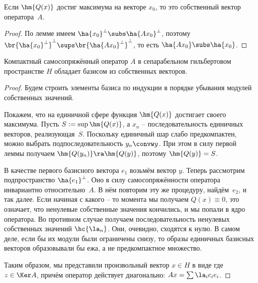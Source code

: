 \documentclass[a4paper]{article}
\begin{document}
\begin{imp}
Если $\hm{Q(x)}$ достиг максимума на векторе $x_0$, то это собственный вектор оператора~$A$.
\end{imp}
\begin{proof}
По лемме имеем $\ha{x_0}^\bot \subs \ha{Ax_0}^\bot$, поэтому $\br{\ha{x_0}^\bot}^\bot \sups
\br{\ha{Ax_0}^\bot}^\bot$, то есть $\ha{Ax_0} \subs \ha{x_0}$.
\end{proof}

\begin{theorem}
Компактный самосопряжённый оператор $A$ в сепарабельном гильбертовом пространстве $H$
обладает базисом из собственных векторов.
\end{theorem}
\begin{proof}
Будем строить элементы базиса по индукции в порядке убывания модулей собственных значений.

Покажем, что на единичной сфере функция $\hm{Q(x)}$ достигает своего максимума. Пусть $S := \sup \hm{Q(x)}$,
а $x_n$ -- последовательность единичных векторов, реализующая~$S$. Поскольку единичный шар
слабо предкомпактен, можно выбрать подпоследовательность $y_n \convw y$. При этом
в силу первой леммы получаем $\hm{Q(y_n)} \ra \hm{Q(y)}$, поэтому $\hm{Q(y)} = S$.

В качестве первого базисного вектора $e_1$ возьмём вектор $y$. Теперь рассмотрим подпространство
$\ha{e_1}^\bot$. Оно в силу самосопряжённости оператора инвариантно относительно~$A$. В нём
повторим эту же процедуру, найдём~$e_2$, и так далее.
Если начиная с какого -- то момента мы получаем $Q(x) \equiv 0$, это означает, что ненулевые собственные
значения кончились, и мы попали в ядро оператора. Во противном случае получаем последовательность
ненулевых собственных значений $\hc{\la_n}$. Они, очевидно, сходятся к нулю. В самом деле, если
бы их модули были ограничены снизу, то образы единичных базисных векторов образовывали бы ежа,
а не предкомпактное множество.

Таким образом, мы представили произвольный вектор $x \in H$ в виде
где $z \in \Ker A$, причём оператор действует диагонально: $Ax = \sum \la_i c_i e_i$.
\end{proof}
\end{document}
